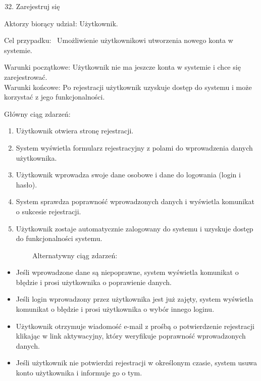 \begin{enumerate}
\setcounter{enumi}{31}
\tightlist
\item
  {Zarejestruj się}
\end{enumerate}

{Aktorzy biorący udział: Użytkownik.}

{Cel przypadku: ~Umożliwienie użytkownikowi utworzenia nowego konta w
systemie.}

{Warunki początkowe: Użytkownik nie ma jeszcze konta w systemie i chce
się zarejestrować.\\
Warunki końcowe: Po rejestracji użytkownik uzyskuje dostęp do systemu i
może korzystać z jego funkcjonalności.}

{Główny ciąg zdarzeń:}

\begin{enumerate}
\tightlist
\item
  {Użytkownik otwiera stronę rejestracji.}
\item
  {System wyświetla formularz rejestracyjny z polami do wprowadzenia
  danych użytkownika.}
\item
  {Użytkownik wprowadza swoje dane osobowe i dane do logowania (login i
  hasło).}
\item
  {System sprawdza poprawność wprowadzonych danych i wyświetla komunikat
  o sukcesie rejestracji.}
\item
  {Użytkownik zostaje automatycznie zalogowany do systemu i uzyskuje
  dostęp do funkcjonalności systemu.}
\end{enumerate}

{~~~~~~~~Alternatywny ciąg zdarzeń:}

\begin{itemize}
\tightlist
\item
  {Jeśli wprowadzone dane są niepoprawne, system wyświetla komunikat o
  błędzie i prosi użytkownika o poprawienie danych.}
\item
  {Jeśli login wprowadzony przez użytkownika jest już zajęty, system
  wyświetla komunikat o błędzie i prosi użytkownika o wybór innego
  loginu.}
\item
  {Użytkownik otrzymuje wiadomość e-mail z prośbą o potwierdzenie
  rejestracji klikając w link aktywacyjny, który weryfikuje poprawność
  wprowadzonych danych.}
\item
  {Jeśli użytkownik nie potwierdzi rejestracji w określonym czasie,
  system usuwa konto użytkownika i informuje go o tym.\\
  }
\end{itemize}

